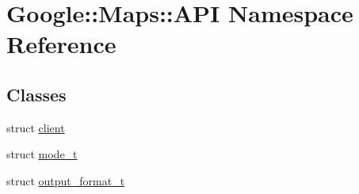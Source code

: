 \hypertarget{a00040}{}\section{Google\+:\+:Maps\+:\+:A\+PI Namespace Reference}
\label{a00040}
\subsection*{Classes}
\begin{DoxyCompactItemize}
\item 
struct \hyperlink{a00047}{client}
\item 
struct \hyperlink{a00051}{mode\+\_\+t}
\item 
struct \hyperlink{a00055}{output\+\_\+format\+\_\+t}
\end{DoxyCompactItemize}
